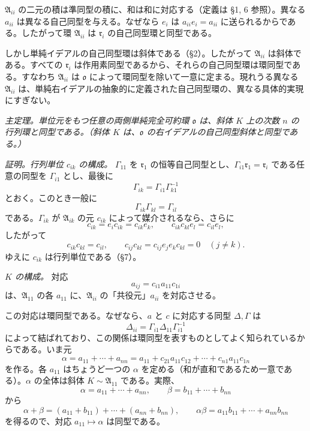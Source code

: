 \documentclass[11pt]{article}
\providecommand{\mA}{\mathfrak{A}}
\providecommand{\mo}{\mathfrak{o}}
\providecommand{\mr}{\mathfrak{r}}
\begin{document}
$\mA_{ii}$ の二元の積は準同型の積に、和は和に対応する（定義は §1, 6 参照）。異なる $a_{ii}$ は異なる自己同型を与える。なぜなら $e_i$ は $a_{ii}e_i=a_{ii}$ に送られるからである。したがって環 $\mA_{ii}$ は $\mr_i$ の自己同型環と同型である。

しかし単純イデアルの自己同型環は斜体である（§2）。したがって $\mA_{ii}$ は斜体である。すべての $\mr_i$ は作用素同型であるから、それらの自己同型環は環同型である。すなわち $\mA_{ii}$ は $\mo$ によって環同型を除いて一意に定まる。現れうる異なる $\mA_{ii}$ は、単純右イデアルの抽象的に定義された自己同型環の、異なる具体的実現にすぎない。

\emph{主定理。単位元をもつ任意の両側単純完全可約環 $\mo$ は、斜体 $K$ 上の次数 $n$ の行列環と同型である。（斜体 $K$ は、$\mo$ の右イデアルの自己同型斜体と同型である。）}

\emph{証明。行列単位 $c_{ik}$ の構成。} $\Gamma_{11}$ を $\mr_1$ の恒等自己同型とし、$\Gamma_{i1}\mr_1=\mr_i$ である任意の同型を $\Gamma_{i1}$ とし、最後に
\[
        \Gamma_{ik}=\Gamma_{i1}\Gamma_{k1}^{-1}
\]
とおく。このとき一般に
\[
        \Gamma_{ik}\Gamma_{kl}=\Gamma_{il}
\]
である。$\Gamma_{ik}$ が $\mA_{ik}$ の元 $c_{ik}$ によって媒介されるなら、さらに
\[
        c_{ik}=e_i c_{ik}=c_{ik}e_k,
        \qquad
        c_{ik}c_{kl}e_l=c_{il}e_l,
\]
したがって
\[
        c_{ik}c_{kl}=c_{il},
        \qquad
        c_{ij}c_{kl}=c_{ij}e_j e_k c_{kl}=0\quad(j\ne k).
\]
ゆえに $c_{ik}$ は行列単位である（§7）。


\emph{$K$ の構成。} 対応
\[
        a_{ij}=c_{i1}a_{11}c_{1i}
\]
は、$\mA_{11}$ の各 $a_{11}$ に、$\mA_{ii}$ の「共役元」$a_{ii}$ を対応させる。

この対応は環同型である。なぜなら、$a$ と $c$ に対応する同型 $\Delta,\Gamma$ は
\[
        \Delta_{ii}=\Gamma_{i1}\Delta_{11}\Gamma_{i1}^{-1}
\]
によって結ばれており、この関係は環同型を表すものとしてよく知られているからである。いま元
\[
        \alpha=a_{11}+\cdots+a_{nn}=a_{11}+c_{21}a_{11}c_{12}+\cdots+c_{n1}a_{11}c_{1n}
\]
を作る。各 $a_{11}$ はちょうど一つの $\alpha$ を定める（和が直和であるため一意である）。$\alpha$ の全体は斜体 $K\sim\mA_{11}$ である。実際、
\[
        \alpha=a_{11}+\cdots+a_{nn},
        \qquad
        \beta=b_{11}+\cdots+b_{nn}
\]
から
\[
        \alpha+\beta=(a_{11}+b_{11})+\cdots+(a_{nn}+b_{nn}),
        \qquad
        \alpha\beta=a_{11}b_{11}+\cdots+a_{nn}b_{nn}
\]
を得るので、対応 $a_{11}\mapsto\alpha$ は同型である。
\end{document}
